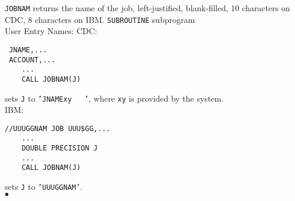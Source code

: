                    
  
                
{\tt JOBNAM} returns the name of the job, left-justified, blank-filled,
10 characters on CDC, 8 characters on IBM.
\Structure
{\tt SUBROUTINE} subprogram \\
User Entry Names: 
\Usage
CDC:
\begin{verbatim}
 JNAME,...
 ACCOUNT,...
    ...
    CALL JOBNAM(J)
\end{verbatim}
sets {\tt J} to {\tt 'JNAMExy\ \ \ '}, where {\tt xy} is provided by
the system. \\[3mm]
IBM:
\begin{verbatim}
//UUUGGNAM JOB UUU$GG,...
    ...
    DOUBLE PRECISION J
    ...
    CALL JOBNAM(J)
\end{verbatim}
sets {\tt J} to {\tt 'UUUGGNAM'}.
\\ $\bullet$
